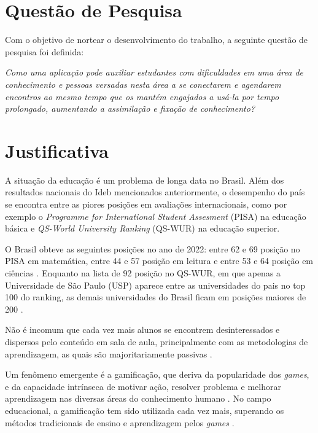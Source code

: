 \section[Questão de Pesquisa]{Questão de Pesquisa}
\label{sec:questao}

Com o objetivo de nortear o desenvolvimento do trabalho, a seguinte questão de
pesquisa foi definida:

\textit{Como uma aplicação pode auxiliar estudantes com dificuldades em uma área de conhecimento e pessoas versadas nesta área a se conectarem e agendarem encontros ao mesmo tempo que os mantém engajados a usá-la por tempo prolongado, aumentando a assimilação e fixação de conhecimento?}

\section[Justificativa]{Justificativa}
\label{sec:justificativa}

A situação da educação é um problema de longa data no Brasil. Além dos resultados nacionais do Ideb mencionados anteriormente, o desempenho do país se encontra entre as piores posições em avaliações internacionais, como por exemplo o \textit{Programme for International Student Assesment} (PISA) na educação básica e \textit{QS-World University Ranking} (QS-WUR) na educação superior.

O Brasil obteve as seguintes posições no ano de 2022: entre 62\textordfeminine{} e 69\textordfeminine{} posição no PISA em matemática, entre 44\textordfeminine{} e 57\textordfeminine{} posição em leitura e entre 53\textordfeminine{} e 64\textordfeminine{} posição em ciências \cite{pisa2022}.
Enquanto na lista de 92\textordfeminine{} posição  no QS-WUR, em que apenas a Universidade de São Paulo (USP) aparece entre as universidades do pais no top 100 do ranking, as demais universidades do Brasil ficam em posições maiores de 200 \cite{qswur2025}.

Não é incomum que cada vez mais alunos se encontrem desinteressados e dispersos pelo conteúdo em sala de aula, principalmente com as metodologias de aprendizagem, as quais são majoritariamente passivas \cite{fragelli2017game}.

Um fenômeno emergente é a gamificação, que deriva da popularidade dos \textit{games}, e da capacidade intrínseca de motivar ação, resolver problema e melhorar aprendizagem nas diversas áreas do conhecimento humano \cite{fardo2013gamificacao}.
No campo educacional, a gamificação tem sido utilizada cada vez mais, superando
os métodos tradicionais de ensino e aprendizagem pelos \textit{games} \cite{souza2025metodologias}.

